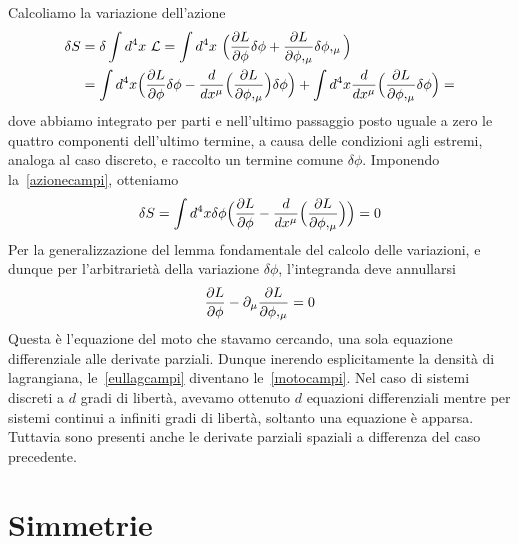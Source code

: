     Calcoliamo la variazione dell'azione
    \begin{equation*}
    \begin{aligned}
        \delta S & = \delta \int d^4 x ~ \mathcal L = \int d^4 x ~ \Big (\frac{\partial L}{\partial\phi} \delta \phi + \frac{\partial L}{\partial\phi,_\mu} \delta \phi,_\mu \Big) \\ & = \int d^4 x \Big (\frac{\partial L}{\partial\phi} \delta \phi - \frac{d}{dx^\mu} \Big (\frac{\partial L}{\partial\phi,_\mu} \Big) \delta \phi \Big) + \int d^4 x \frac{d}{dx^\mu} \Big ( \frac{\partial L}{\partial\phi,_\mu} \delta \phi \Big ) = 
    \end{aligned}
    \end{equation*}
    dove abbiamo integrato per parti e nell'ultimo passaggio posto uguale a zero le quattro componenti dell'ultimo termine, a causa delle condizioni agli estremi, analoga al caso discreto, e raccolto un termine comune $\delta \phi$. Imponendo la~\eqref{azionecampi}, otteniamo
    \begin{equation*}
        \delta S = \int d^4 x \delta \phi \Big (\frac{\partial L}{\partial\phi} - \frac{d}{dx^\mu} \Big (\frac{\partial L}{\partial\phi,_\mu} \Big) \Big)  = 0
    \end{equation*}
    Per la generalizzazione del lemma fondamentale del calcolo delle variazioni, e dunque per l'arbitrarietà della variazione $\delta \phi$, l'integranda deve annullarsi
    \begin{equation} \label{eullagcampi}
        \frac{\partial L}{\partial\phi} - \partial_\mu \frac{\partial L}{\partial\phi,_\mu} = 0
    \end{equation}
    Questa è l'equazione del moto che stavamo cercando, una sola equazione differenziale alle derivate parziali. Dunque inerendo esplicitamente la densità di lagrangiana, le~\eqref{eullagcampi} diventano le~\eqref{motocampi}. Nel caso di sistemi discreti a $d$ gradi di libertà, avevamo ottenuto $d$ equazioni differenziali mentre per sistemi continui a infiniti gradi di libertà, soltanto una equazione è apparsa. Tuttavia sono presenti anche le derivate parziali spaziali a differenza del caso precedente. 

\section{Simmetrie}
    
